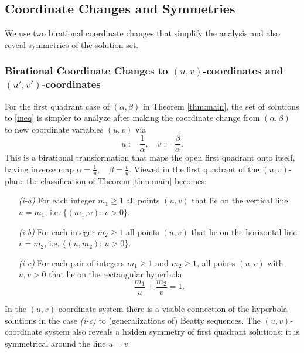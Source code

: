 \documentclass[12pt,letterpaper, reqno]{amsart}
\theoremstyle{definition}
\theoremstyle{remark}
\newcommand{\uu}{{u'}}
\newcommand{\vv}{{v'}}
\begin{document}
% 
\subsection{Coordinate Changes and Symmetries}

We use two  birational  coordinate changes that  simplify the analysis and also reveal
symmetries of the solution set.

%
%
\subsubsection{Birational Coordinate Changes to $(u, v)$-coordinates  and $(\uu, \vv)$-coordinates}\label{sec:131}

For the first quadrant case  of $(\alpha, \beta)$ in Theorem \ref{thm:main},  the set of solutions to \eqref{ineq} is 
simpler to analyze after making  the 
coordinate change
from $(\alpha, \beta)$ to new coordinate variables $(u,v)$ via  
$$u := \frac{1}{\alpha}, \quad v  := \frac{\beta}{\alpha}.$$
This is a birational transformation that maps the open first quadrant onto  itself, having  inverse map
$\alpha= \frac{1}{u}, \quad \beta= \frac{v}{u}.$
 Viewed in  the first quadrant of the $(u, v)$-plane 
the classification of Theorem \ref{thm:main} becomes:
\begin{enumerate}
\item[{\it (i-a)}] For each integer $m_1 \ge 1$ all points $(u, v)$ that lie  on the vertical line $u=m_1$, i.e. 
$\{(m_1, v): \, v >0 \}$.
\item[{\it (i-b)}] For each  integer $m_2 \ge 1$ all points $(u, v)$ that lie on the  horizontal line $v= m_2$, i.e. $\{(u, m_2): \, u >0 \}$.
\item[{\it (i-c)}] For each pair of integers $m_1\ge 1$ and $m_2 \ge 1$, all points $(u, v)$ with $u, v>0$ that lie on the rectangular hyperbola
$$\frac{m_1}{u}  + \frac{m_2 }{v} =1.$$
\end{enumerate} 
In the $(u, v)$-coordinate system there is a visible connection of the hyperbola solutions in  the case {\it (i-c)}  to (generalizations of) Beatty sequences. 
The $(u,v)$-coordinate system also reveals a hidden symmetry of  first quadrant solutions:
it is  symmetrical around the line $u= v$.
\end{document}
